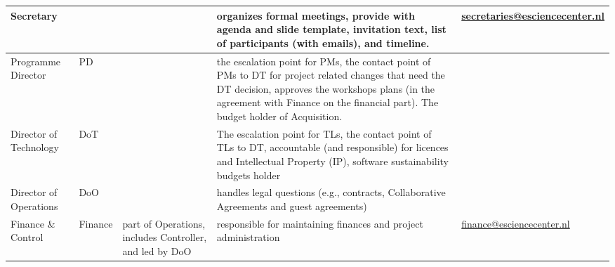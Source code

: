 \begin{tabularx}{\linewidth}{p{}|p{}|p{}|p{}|p{}}
Secretary                                          &                       &                                                                                                                   & organizes formal meetings, provide with agenda and slide template, invitation text, list of participants (with emails), and timeline.                                                                                                  &  \href{mailto:secretaries@esciencecenter.nl}{secretaries@esciencecenter.nl}                                                          \\\hline
Programme Director                                 & PD                    &                                                                                                                   & the escalation point for PMs, the contact point of PMs to DT for project related changes that need the DT decision, approves the workshops plans (in the agreement with Finance on the financial part). The budget holder of Acquisition. &                                                                                                                                      \\\hline
Director of Technology                             & DoT                   &                                                                                                                   & The escalation point for TLs, the contact point of TLs to DT, accountable (and responsible) for licences and Intellectual Property (IP), software sustainability budgets holder                                                        &                                                                                                                                      \\\hline
Director of Operations                             & DoO                   &                                                                                                                   & handles legal questions (e.g., contracts, Collaborative Agreements and guest agreements)                                                                                               &                                                                                                                                      \\\hline
Finance \& Control                                 & Finance               & part of Operations, includes Controller, and led by DoO                                                           & responsible for maintaining finances and project administration                                                                                                                                                                & \href{mailto:finance@esciencecenter.nl}{finance@esciencecenter.nl}                                                                   \\\hline

\end{tabularx}
